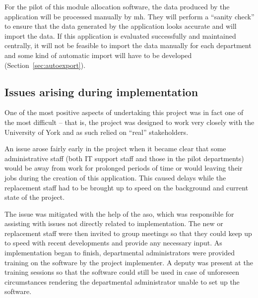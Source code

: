 \documentclass[draft]{scrartcl}
\begin{document}
For the pilot of this module allocation software, the data produced by the
application will be processed manually by \gls{mh}. They will
perform a ``sanity check'' to ensure that the data generated by the
application looks accurate and will import the data. If this application is
evaluated successfully and maintained centrally, it will not be feasible to
import the data manually for each department and some kind of automatic import
will have to be developed (Section~\ref{sec:autoexport}).





\subsection{Issues arising during implementation}



One of the most positive aspects of undertaking this project was in fact one
of the most difficult -- that is, the project was designed to work very
closely with the University of York and as such relied on ``real''
stakeholders.

An issue arose fairly early in the project when it became clear that some
administrative staff (both IT support staff and those in the pilot
departments) would be away from work for prolonged periods of time or would
leaving their jobs during the creation of this application. This caused delays
while the replacement staff had to be brought up to speed on the background
and current state of the project.

The issue was mitigated with the help of the \gls{aso}, which was responsible
for assisting with issues not directly related to implementation. The new or
replacement staff were then invited to group meetings so that they could keep
up to speed with recent developments and provide any necessary input. As
implementation began to finish, departmental administrators were provided
training on the software by the project implementer. A deputy was present at
the training sessions so that the software could still be used in case of
unforeseen circumstances rendering the departmental administrator unable to
set up the software.

\end{document}
